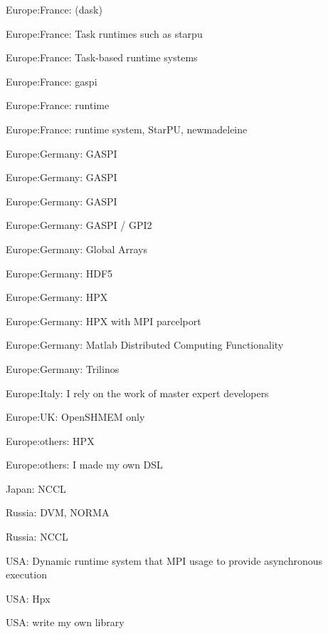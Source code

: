 \item Europe:France: (dask)
\item Europe:France: Task runtimes such as starpu
\item Europe:France: Task-based runtime systems
\item Europe:France: gaspi
\item Europe:France: runtime
\item Europe:France: runtime system, StarPU, newmadeleine
\item Europe:Germany: GASPI
\item Europe:Germany: GASPI
\item Europe:Germany: GASPI
\item Europe:Germany: GASPI / GPI2
\item Europe:Germany: Global Arrays
\item Europe:Germany: HDF5
\item Europe:Germany: HPX
\item Europe:Germany: HPX with MPI parcelport
\item Europe:Germany: Matlab Distributed Computing Functionality
\item Europe:Germany: Trilinos
\item Europe:Italy: I rely on the work of master expert developers
\item Europe:UK: OpenSHMEM only
\item Europe:others: HPX
\item Europe:others: I made my own DSL
\item Japan: NCCL
\item Russia: DVM, NORMA
\item Russia: NCCL
\item USA: Dynamic runtime system that MPI usage to provide asynchronous execution
\item USA: Hpx
\item USA: write my own library
